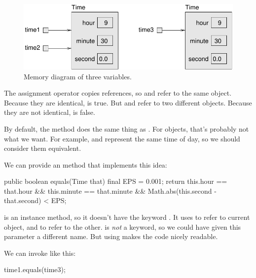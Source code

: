 
\begin{figure}[!ht]
\begin{center}
\includegraphics{figs/time2.pdf}
\caption{Memory diagram of three  variables.}
\label{fig.time2}
\end{center}
\end{figure}

The assignment operator copies references, so  and  refer to the same object.
Because they are identical,  is true.
But  and  refer to two different objects.
Because they are not identical,  is false.

By default, the  method does the same thing as \java{==}.
For  objects, that's probably not what we want.
For example,  and  represent the same time of day, so we should consider them equivalent.


We can provide an  method that implements this idea:

\begin{code}
public boolean equals(Time that) {
    final EPS = 0.001;
    return this.hour == that.hour
        && this.minute == that.minute
        && Math.abs(this.second - that.second) < EPS;
}
\end{code}

 is an instance method, so it doesn't have the keyword .
It uses  to refer to current object, and  to refer to the other.
 is {\em not} a keyword, so we could have given this parameter a different name.  But using  makes the code nicely readable. 

We can invoke  like this:

\begin{code}
time1.equals(time3);
\end{code}

